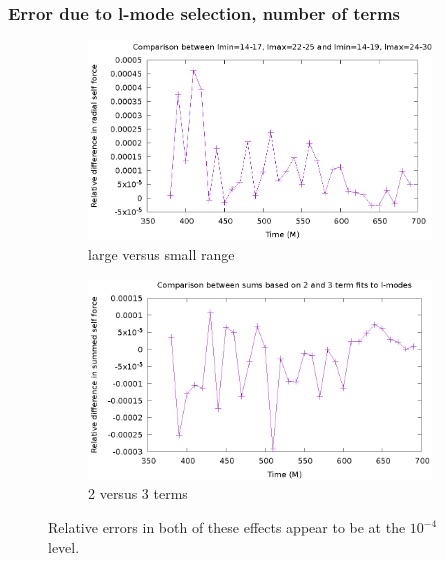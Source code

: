 \documentclass{beamer}
\begin{document}
\begin{frame}
  \frametitle{Error due to l-mode selection, number of terms}
  \begin{figure}
    \centering
    \begin{subfigure}{.45\textwidth}
      \centering
      \includegraphics[width=\textwidth]{relErrBigSmallRangeOverTime}
      \caption{large versus small range}
    \end{subfigure}
    \begin{subfigure}{.45\textwidth}
      \centering
      \includegraphics[width=\textwidth]{relativeError23termSelfForce}
      \caption{2 versus 3 terms}
    \end{subfigure}
  \caption{Relative errors in both of these effects appear to be at the $10^{-4}$ level.}
  \end{figure}
\end{frame}
\end{document}
